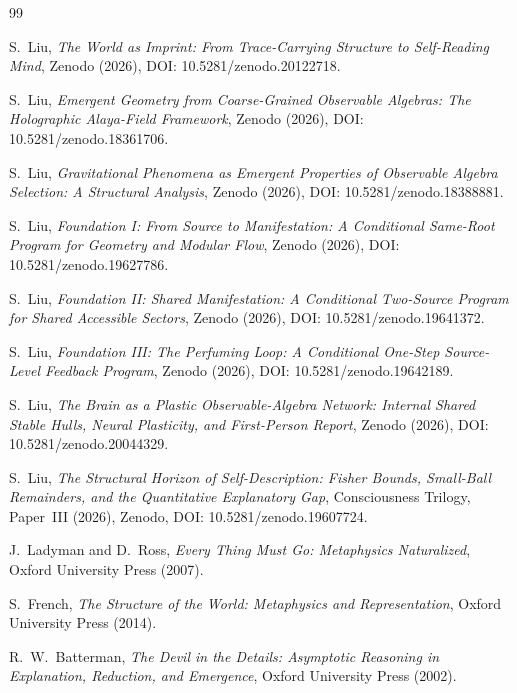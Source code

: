 \documentclass[12pt]{article}
\begin{document}
\begin{thebibliography}{99}

S.~Liu,
\emph{The World as Imprint: From Trace-Carrying Structure to Self-Reading Mind},
Zenodo (2026), DOI: 10.5281/zenodo.20122718.

S.~Liu,
\emph{Emergent Geometry from Coarse-Grained Observable Algebras: The Holographic Alaya-Field Framework},
Zenodo (2026), DOI: 10.5281/zenodo.18361706.

S.~Liu,
\emph{Gravitational Phenomena as Emergent Properties of Observable Algebra Selection: A Structural Analysis},
Zenodo (2026), DOI: 10.5281/zenodo.18388881.

S.~Liu,
\emph{Foundation I: From Source to Manifestation: A Conditional Same-Root Program for Geometry and Modular Flow},
Zenodo (2026), DOI: 10.5281/zenodo.19627786.

S.~Liu,
\emph{Foundation II: Shared Manifestation: A Conditional Two-Source Program for Shared Accessible Sectors},
Zenodo (2026), DOI: 10.5281/zenodo.19641372.

S.~Liu,
\emph{Foundation III: The Perfuming Loop: A Conditional One-Step Source-Level Feedback Program},
Zenodo (2026), DOI: 10.5281/zenodo.19642189.

S.~Liu,
\emph{The Brain as a Plastic Observable-Algebra Network: Internal Shared Stable Hulls, Neural Plasticity, and First-Person Report},
Zenodo (2026), DOI: 10.5281/zenodo.20044329.

S.~Liu,
\emph{The Structural Horizon of Self-Description: Fisher Bounds, Small-Ball Remainders, and the Quantitative Explanatory Gap},
Consciousness Trilogy, Paper~III (2026), Zenodo, DOI: 10.5281/zenodo.19607724.

J.~Ladyman and D.~Ross,
\emph{Every Thing Must Go: Metaphysics Naturalized},
Oxford University Press (2007).

S.~French,
\emph{The Structure of the World: Metaphysics and Representation},
Oxford University Press (2014).

R.~W.~Batterman,
\emph{The Devil in the Details: Asymptotic Reasoning in Explanation, Reduction, and Emergence},
Oxford University Press (2002).

\end{thebibliography}
\end{document}
